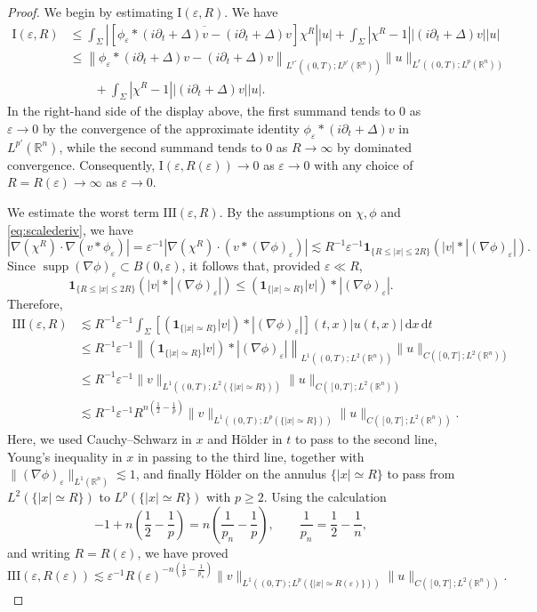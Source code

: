 \documentclass[11pt,a4paper]{amsart}
\theoremstyle{remark}
\theoremstyle{definition}
\DeclareMathOperator{\supp}{supp}
\newcommand{\R}{\mathbb{R}}
\newcommand{\dd}{\mathrm{d}}
\def\ve{\varepsilon}
\def\ind{\mathbf 1}
\def\ovl{\overline}
\def\d{\partial}
\begin{document}
\begin{proof}
We begin by estimating $\mathrm I(\ve,R)$. We have
\[
\begin{split}
\mathrm{I}(\ve,R) &\leq  \int_\Sigma \left| \left[\ovl{\phi_\ve*\left(i\d_t+\Delta\right)v - \left(i\d_t+\Delta\right)v } \right] \chi^R \right| |u|  + \int_\Sigma \left|\chi^R - 1\right| \left|\left(i\d_t +\Delta\right)v \right| |u| 
\\
&\leq \left\| \phi_\ve*\left(i\d_t+\Delta\right)v - \left(i\d_t+\Delta\right)v \right\|_{L^{r'}((0, T); L^{p'}(\R^n))} \| u \|_{L^r((0, T); L^p(\R^n))} 
\\
& \qquad + \int_\Sigma \left|\chi^R - 1\right| \left|\left(i\d_t +\Delta\right)v \right| |u|.
\end{split}
\]
In the right-hand side of the display above, the first summand tends to $0$ as $\varepsilon\to0$ by the convergence of the approximate identity $\phi_\varepsilon*(i\d_t+\Delta)v$ in $L^{p'}(\R^n)$, while the second summand tends to $0$ as $R\to\infty$ by dominated convergence. Consequently, $\mathrm I(\ve,R(\ve))\to 0$ as $\varepsilon\to0$ with any choice of $R=R(\varepsilon)\to\infty$ as $\ve \to 0$.

We estimate the worst term $\mathrm{III}(\varepsilon,R)$. By the assumptions on $\chi,\phi$ and \eqref{eq:scalederiv}, we have
\[
\left|\nabla(\chi^R)\cdot\nabla(v*\phi_\varepsilon)\right|= \ve^{-1} \left|\nabla(\chi^R)\cdot (v*(\nabla\phi)_\varepsilon)\right| \lesssim R^{-1}\varepsilon^{-1} \ind_{\{R\le |x|\le 2R\}}  \left(|v|*|(\nabla\phi)_\varepsilon|\right).
\]
Since $\supp (\nabla\phi)_\varepsilon \subset B(0,\varepsilon)$, it follows that, provided
$\varepsilon\ll R$,
\[
\ind_{\{R\le |x|\le 2R\}}\left(|v|*|(\nabla\phi)_\varepsilon|\right) \leq \left(\ind_{\{|x|\simeq R\}}|v|\right)*|(\nabla\phi)_\varepsilon|.
\]
Therefore,
\[
\begin{split}
\mathrm{III}(\varepsilon,R) &\lesssim R^{-1}\varepsilon^{-1}\int_\Sigma \left[\left(\ind_{\{|x|\simeq R\}}|v|\right)*|(\nabla\phi)_\varepsilon|\right](t,x) |u(t,x)|\,\dd x\,\dd t
\\
&\le R^{-1}\varepsilon^{-1}  \left\|\left(\ind_{\{|x|\simeq R\}}|v|\right)*|(\nabla\phi)_\varepsilon|\right\|_{L^1((0,T);L^2(\R^n))} \|u\|_{C([0,T];L^2(\R^n))}
\\
&\le R^{-1}\varepsilon^{-1} \|v\|_{L^1((0,T);L^2(\{|x|\simeq R\}))}\|u\|_{C([0,T];L^2(\R^n))} 
\\
&\lesssim R^{-1}\varepsilon^{-1}  R^{n(\frac12-\frac1p)} \|v\|_{L^1((0,T);L^p(\{|x|\simeq R\}))}\|u\|_{C([0,T];L^2(\R^n))} .
\end{split}
\]
Here, we used Cauchy--Schwarz in $x$ and H\"older in $t$ to pass to the second line, Young's inequality in $x$ in passing to the third line, together with $\|(\nabla\phi)_\varepsilon\|_{L^1(\R^n)}\lesssim 1$, and finally H\"older on the annulus $\{|x|\simeq R\}$ to pass from $L^2(\{|x|\simeq R\})$ to $L^p(\{|x|\simeq R\})$ with $p\geq2$. Using the calculation
\[
-1+n\left(\frac12-\frac1p\right)= n\left(\frac1{p_n}-\frac1p\right), \qquad  \frac1{p_n}=\frac12-\frac1n,
\]
and writing $R=R(\varepsilon)$, we have proved
\[
\mathrm{III}(\varepsilon,R(\varepsilon)) \lesssim \varepsilon^{-1}R(\varepsilon)^{-n(\frac1p-\frac1{p_n})} \|v\|_{L^1((0,T);L^p(\{|x|\simeq R(\varepsilon)\}))} \|u\|_{C([0,T];L^2(\R^n))}.
\]


\end{proof}
\end{document}
